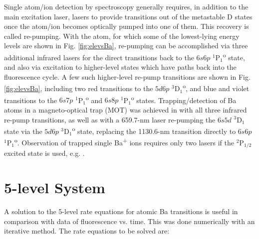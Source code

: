 

Single atom/ion detection by spectroscopy generally requires, in addition to the main excitation laser, lasers to provide transitions out of the metastable D states once the atom/ion becomes optically pumped into one of them.  This recovery is called re-pumping.  With the atom, for which some of the lowest-lying energy levels are shown in Fig. \ref{fig:elevsBa}, re-pumping can be accomplished via three additional infrared lasers for the direct transitions back to the $6s6p$ $^{1}$P$_{1}$\textsuperscript{o} state, and also via excitation to higher-level states which have paths back into the fluorescence cycle.  A few such higher-level re-pump transitions are shown in Fig. \ref{fig:elevsBa}, including two red transitions to the $5d6p$ $^{3}$D$_{1}$\textsuperscript{o}, and blue and violet transitions to the $6s7p$ $^{1}$P$_{1}$\textsuperscript{o} and $6s8p$ $^{1}$P$_{1}$\textsuperscript{o} states.  Trapping/detection of Ba atoms in a magneto-optical trap (MOT) was achieved in \cite{BaMOT} with all three infrared re-pump transitions, as well as with a 659.7-nm laser re-pumping the $6s5d$ $^{3}$D$_{1}$ state via the $5d6p$ $^{3}$D$_{1}$\textsuperscript{o} state, replacing the 1130.6-nm transition directly to $6s6p$ $^{1}$P$_{1}$\textsuperscript{o}.  Observation of trapped single Ba\textsuperscript{+} ions requires only two lasers if the $^{2}$P$_{1/2}$ excited state is used, e.g. \cite{singleBaPlusEXO}.

\section{5-level System}
\label{sec:model}



A solution to the 5-level rate equations for atomic Ba transitions is useful in comparison with data of fluorescence vs. time.  This was done numerically with an iterative method.  The rate equations to be solved are:

